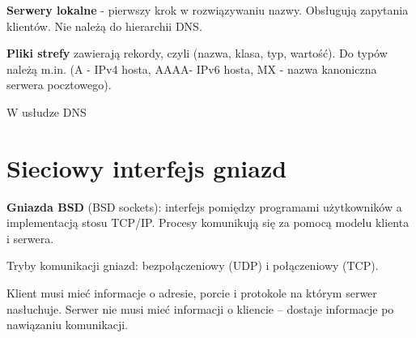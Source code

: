 \textbf{Serwery lokalne} - pierwszy krok w rozwiązywaniu nazwy. Obsługują zapytania klientów. Nie należą do hierarchii DNS.

\textbf{Pliki strefy} zawierają rekordy, czyli (nazwa, klasa, typ, wartość). Do typów należą m.in. (A - IPv4 hosta, AAAA-  IPv6 hosta, MX - nazwa kanoniczna serwera pocztowego).


\begin{problems}
     \prob W usłudze DNS
    
\end{problems}

\section{Sieciowy interfejs gniazd}

\textbf{Gniazda BSD} (BSD sockets): interfejs pomiędzy programami użytkowników a implementacją stosu TCP/IP. Procesy komunikują się za pomocą modelu klienta i serwera.

Tryby komunikacji gniazd: bezpołączeniowy (UDP) i połączeniowy (TCP).

Klient musi mieć informacje o adresie, porcie i protokole na którym serwer nasłuchuje. Serwer nie musi mieć informacji o kliencie – dostaje informacje po nawiązaniu komunikacji.

